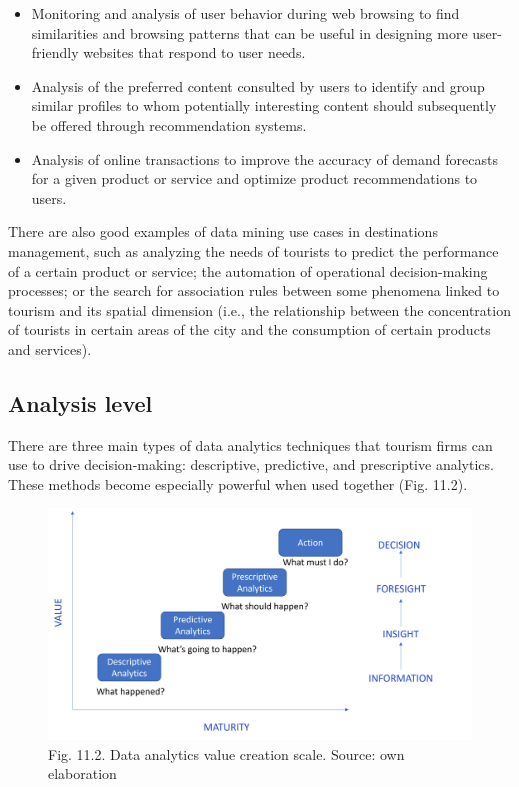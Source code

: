 \documentclass[
  letterpaper,
  DIV=11,
  numbers=noendperiod]{scrreprt}
\begin{document}
\begin{itemize}
\item
  Monitoring and analysis of user behavior during web browsing to find
  similarities and browsing patterns that can be useful in designing
  more user-friendly websites that respond to user needs.
\item
  Analysis of the preferred content consulted by users to identify and
  group similar profiles to whom potentially interesting content should
  subsequently be offered through recommendation systems.
\item
  Analysis of online transactions to improve the accuracy of demand
  forecasts for a given product or service and optimize product
  recommendations to users.
\end{itemize}

There are also good examples of data mining use cases in destinations
management, such as analyzing the needs of tourists to predict the
performance of a certain product or service; the automation of
operational decision-making processes; or the search for association
rules between some phenomena linked to tourism and its spatial dimension
(i.e., the relationship between the concentration of tourists in certain
areas of the city and the consumption of certain products and services).

\hypertarget{analysis-level}{%
\subsection{Analysis level}\label{analysis-level}}

There are three main types of data analytics techniques that tourism
firms can use to drive decision-making: descriptive, predictive, and
prescriptive analytics. These methods become especially powerful when
used together (Fig. 11.2).

\begin{figure}

{\centering \includegraphics{img/fig15.png}

}

\caption{Fig. 11.2. Data analytics value creation scale. Source: own
elaboration}

\end{figure}
\end{document}
